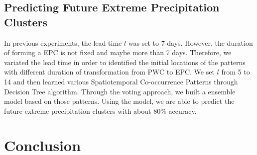 \documentclass{acm_proc_article-sp}
\begin{document}
\subsection{Predicting Future Extreme Precipitation Clusters}
In previous experiments, the lead time $l$ was set to 7 days. However, the duration of forming a EPC is not fixed and maybe more than 7 days. Therefore, we variated the lead time in order to identified the initial locations of the patterns with different duration of transformation from PWC to EPC. We set $l$ from 5 to 14 and then learned various Spatiotemporal Co-occurrence Patterns through Decision Tree algorithm. Through the voting approach, we built a ensemble model based on those patterns. Using the model, we are able to predict the future extreme precipitation clusters with about 80\% accuracy.        

\section{Conclusion}
\label{sec:Conclusion}


 
\balancecolumns
\end{document}
